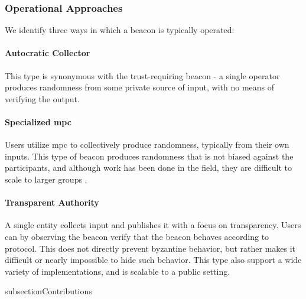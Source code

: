 \subsubsection{Operational Approaches}
We identify three ways in which a beacon is typically operated:

\paragraph{Autocratic Collector} This type is synonymous with the trust-requiring beacon - a single operator produces randomness from some private source of input, with no means of verifying the output.

\paragraph{Specialized \acrshort{mpc}} Users utilize \acrfull{mpc} to collectively produce randomness, typically from their own inputs. This type of beacon produces randomness that is not biased against the participants, and although work has been done in the field, they are difficult to scale to larger groups \cite{cascudo2017scrape, syta2017scalable}.

\paragraph{Transparent Authority}  A single entity collects input and publishes it with a focus on transparency. Users can by observing the beacon verify that the beacon behaves according to protocol. This does not directly prevent byzantine behavior, but rather makes it difficult or nearly impossible to hide such behavior. This type also support a wide variety of implementations, and is scalable to a public setting.

subsection{Contributions}
